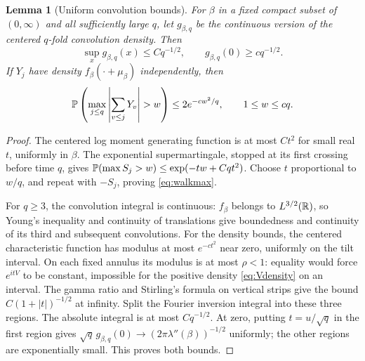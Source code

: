 \documentclass[11pt]{article}
\newtheorem{lemma}[theorem]{Lemma}
\theoremstyle{definition}\newtheorem{definition}[theorem]{Definition}
\theoremstyle{remark}\newtheorem{remark}[theorem]{Remark}
\numberwithin{equation}{section}\allowdisplaybreaks
\begin{document}
\begin{lemma}[Uniform convolution bounds]\label{lem:walk}
For $\beta$ in a fixed compact subset of $(0,\infty)$ and all sufficiently
large $q$, let $g_{\beta,q}$ be the continuous version of the centered
$q$-fold convolution density. Then
\[
 \sup_x g_{\beta,q}(x)\le Cq^{-1/2},\qquad
 g_{\beta,q}(0)\ge cq^{-1/2}.
\]
If $Y_j$ have density $f_\beta(\cdot+\mu_\beta)$ independently, then
\begin{equation}\label{eq:walkmax}
 \Pp\left(\max_{j\le q}\left|\sum_{v\le j}Y_v\right|>w\right)
 \le2e^{-cw^2/q},\qquad 1\le w\le c q.
\end{equation}
\end{lemma}
\begin{proof}
The centered log moment generating function is at most $Ct^2$ for
small real $t$, uniformly in $\beta$. The exponential supermartingale,
stopped at its first crossing before time $q$, gives
$\mathbb P(\max S_j>w)\le\exp(-tw+Cqt^2)$.
Choose $t$ proportional to $w/q$, and repeat with $-S_j$, proving
\eqref{eq:walkmax}.

For $q\ge3$, the convolution integral is continuous: $f_\beta$ belongs
to $L^{3/2}(\mathbb R)$, so Young's inequality and continuity of translations
give boundedness and continuity of its third and subsequent convolutions.
For the density bounds, the centered characteristic function has modulus
at most $e^{-ct^2}$ near zero, uniformly on the tilt interval. On each
fixed annulus its modulus is at most $\rho<1$: equality would force
$e^{itV}$ to be constant, impossible for the positive density
\eqref{eq:Vdensity} on an interval. The gamma ratio and Stirling's formula
on vertical strips give the bound $C(1+|t|)^{-1/2}$ at infinity.
Split the Fourier inversion integral into these three regions. The
absolute integral is at most $Cq^{-1/2}$. At zero, putting $t=u/\sqrt q$
in the first region gives
$\sqrt q\,g_{\beta,q}(0)\to(2\pi\lambda''(\beta))^{-1/2}$ uniformly;
the other regions are exponentially small. This proves both bounds.
\end{proof}
\end{document}
